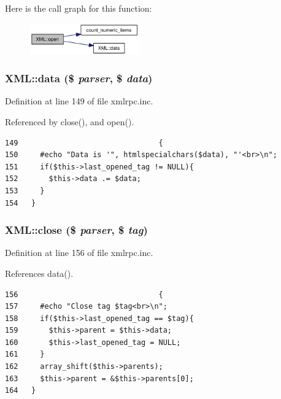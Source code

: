 Here is the call graph for this function:\nopagebreak
\begin{figure}[H]
\begin{center}
\leavevmode
\includegraphics[width=134pt]{classXML_eac7eae74d866d4f5a0cdb9be27ff279_cgraph}
\end{center}
\end{figure}
\hypertarget{classXML_ca70dfbd3e8ce956075181701b09b033}{
\subsubsection{\setlength{\rightskip}{0pt plus 5cm}XML::data (\$ {\em parser}, \$ {\em data})}}
\label{classXML_ca70dfbd3e8ce956075181701b09b033}




Definition at line 149 of file xmlrpc.inc.

Referenced by close(), and open().

\begin{Code}\begin{verbatim}149                                {
150     #echo "Data is '", htmlspecialchars($data), "'<br>\n";
151     if($this->last_opened_tag != NULL){
152       $this->data .= $data;
153     }
154   }
\end{verbatim}
\end{Code}


\hypertarget{classXML_60144a2134fc1b7f5b4b1b6a7c56bf04}{
\subsubsection{\setlength{\rightskip}{0pt plus 5cm}XML::close (\$ {\em parser}, \$ {\em tag})}}
\label{classXML_60144a2134fc1b7f5b4b1b6a7c56bf04}




Definition at line 156 of file xmlrpc.inc.

References data().

\begin{Code}\begin{verbatim}156                                {
157     #echo "Close tag $tag<br>\n";
158     if($this->last_opened_tag == $tag){
159       $this->parent = $this->data;
160       $this->last_opened_tag = NULL;
161     }
162     array_shift($this->parents);
163     $this->parent = &$this->parents[0];
164   }
\end{verbatim}
\end{Code}




